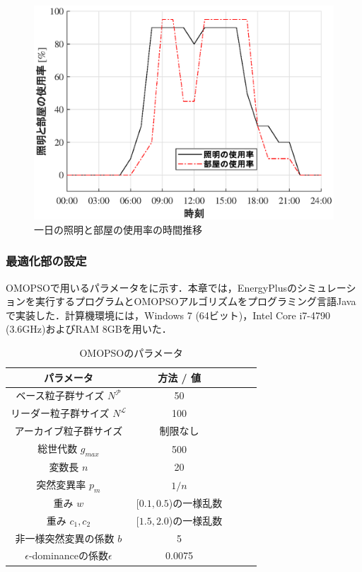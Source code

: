 \begin{figure}[t]
  \begin{center}
    \includegraphics[width=0.7\linewidth]{fig/sim_occupancy.eps}
  \end{center}
  \caption{一日の照明と部屋の使用率の時間推移}
  \label{fig::sim_occupancy}
\end{figure}

\subsubsection{最適化部の設定}
OMOPSOで用いるパラメータをに示す．本章では，EnergyPlusのシミュレーションを実行するプログラムとOMOPSOアルゴリズムをプログラミング言語Javaで実装した．計算機環境には，Windows 7 (64ビット)，Intel Core i7-4790 (3.6GHz)およびRAM 8GBを用いた．

\begin{table}[ht]
  {\small
    \begin{center}
      \caption{OMOPSOのパラメータ}
      \label{tab::sim_param_omopso}
      \begin{tabular}{c|cccc}
        \hline
        パラメータ                             & 方法 / 値              \\
        \hline \hline
        ベース粒子群サイズ $N^{\mathcal{P}}$   & 50                     \\
        リーダー粒子群サイズ $N^{\mathcal{L}}$ & 100                    \\
        アーカイブ粒子群サイズ                 & 制限なし               \\
        総世代数 $g_{max}$                     & 500                    \\
        変数長 $n$                             & 20                     \\
        突然変異率 $p_m$                       & $1/n$                  \\
        重み $w$                               & [$0.1, 0.5$)の一様乱数 \\
        重み $c_1, c_2$                        & [$1.5, 2.0$)の一様乱数 \\
        非一様突然変異の係数 $b$               & 5 \cite{Esquivel03}    \\
        $\epsilon$-dominanceの係数$\epsilon$   & 0.0075                 \\
        \hline
      \end{tabular}
    \end{center}
  }
\end{table}


